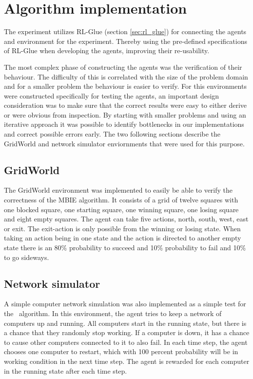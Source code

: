 \section{Algorithm implementation}
\label{sec:implementation}

The experiment utilizes RL-Glue (section \ref{sec:rl_glue}) for connecting the
agents and environment for the experiment. Thereby using the pre-defined
specifications of RL-Glue when developing the agents, improving their
re-usability. 

The most complex phase of constructing the agents was the verification of their
behaviour. The difficulty of this is correlated with the size of the problem
domain and for a smaller problem the behaviour is easier to verify. For this 
environments were constructed specifically for testing the agents, an
important design consideration was to make sure that the correct results were
easy to either derive or were obvious from inspection. By starting with smaller
problems and using an iterative approach it was possible to identify
bottlenecks in our implementations and correct possible errors early. The two
following sections describe the GridWorld and network simulator enviornments
that were used for this purpose. 

\subsection{GridWorld}

The GridWorld environment was implemented to easily be able to verify the
correctness of the MBIE algorithm. It consists of a grid of twelve squares with
one blocked square, one starting square, one winning square, one losing square and
eight empty squares. The agent can take five actions, north, south, west,
east or exit. The exit-action is only possible from the winning or losing
state. When taking an action being in one state and the action is directed to
another empty state there is an 80\% probability to succeed and 10\%
probability to fail and 10\% to go sideways.

\subsection{Network simulator }

A simple computer network simulation was also implemented as a simple test for
the \etre\ algorithm. In this environment, the agent tries to keep a network of
computers up and running. All computers start in the running state, but there
is a chance that they randomly stop working. If a computer is down, it has a
chance to cause other computers connected to it to also fail. In each time
step, the agent chooses one computer to restart, which with 100 percent
probability will be in working condition in the next time step. The agent is
rewarded for each computer in the running state after each time step. 
